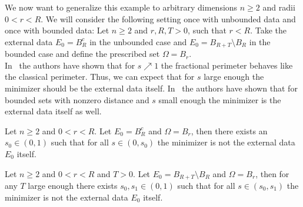 We now want to generalize this example to arbitrary dimensions \( n\geq 2 \) and radii \( 0 < r < R
\). We will consider the following setting once with unbounded data and once with bounded data: Let
\( n \geq 2 \) and \( r, R, T > 0 \), such that \( r < R \). Take the external data \( E_0 = B_R^c
\) in the unbounded case and \( E_0 = B_{R + T} \setminus B_R \) in the bounded case and define the
prescribed set \( \Omega = B_r \). \\

In~\cite{Caffarelli2011} the authors have shown that for \( s \nearrow 1 \) the fractional perimeter
behaves like the classical perimeter. Thus, we can expect that for \( s \) large enough the minimizer
should be the external data itself. In~\cite{dipierro2012asymptotics} the authors have shown that
for bounded sets with nonzero distance and \( s \) small enough the minimizer is the external data
itself as well. \\

\begin{theorem}
	\label{thm:201}
	Let \( n \geq 2 \) and \( 0 < r < R \). Let \( E_0 = B_R^c \) and \( \Omega = B_r \), then there
	exists an \( s_0 \in (0, 1) \) such that for all \( s \in (0, s_0) \) the minimizer is not the
	external data \( E_0 \) itself.
\end{theorem}

\begin{theorem}
	\label{thm:202}
	Let \( n \geq 2 \) and \( 0 < r < R \) and \( T > 0 \). Let \( E_0 = B_{R + T} \setminus B_R \)
	and \( \Omega = B_r \), then for any \( T \) large enough there exists \( s_0, s_1 \in (0, 1) \)
	such that for all \( s \in (s_0, s_1) \) the minimizer is not the external data \( E_0 \) itself.
\end{theorem}

